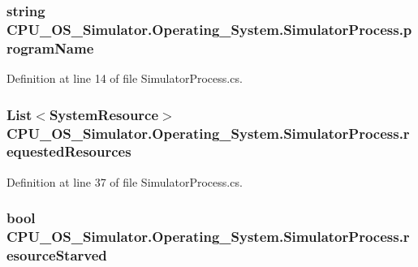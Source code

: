 \subsubsection[{program\+Name}]{\setlength{\rightskip}{0pt plus 5cm}string C\+P\+U\+\_\+\+O\+S\+\_\+\+Simulator.\+Operating\+\_\+\+System.\+Simulator\+Process.\+program\+Name\hspace{0.3cm}{\ttfamily [private]}}\label{class_c_p_u___o_s___simulator_1_1_operating___system_1_1_simulator_process_aacd55b65bf86395ae3c1a446d580030e}


Definition at line 14 of file Simulator\+Process.\+cs.

\hypertarget{class_c_p_u___o_s___simulator_1_1_operating___system_1_1_simulator_process_a93e3c24d4342373d6f0192dce851d269}{}
\subsubsection[{requested\+Resources}]{\setlength{\rightskip}{0pt plus 5cm}List$<${\bf System\+Resource}$>$ C\+P\+U\+\_\+\+O\+S\+\_\+\+Simulator.\+Operating\+\_\+\+System.\+Simulator\+Process.\+requested\+Resources\hspace{0.3cm}{\ttfamily [private]}}\label{class_c_p_u___o_s___simulator_1_1_operating___system_1_1_simulator_process_a93e3c24d4342373d6f0192dce851d269}


Definition at line 37 of file Simulator\+Process.\+cs.

\hypertarget{class_c_p_u___o_s___simulator_1_1_operating___system_1_1_simulator_process_af4d819f0ae416b254b00d1926568b564}{}
\subsubsection[{resource\+Starved}]{\setlength{\rightskip}{0pt plus 5cm}bool C\+P\+U\+\_\+\+O\+S\+\_\+\+Simulator.\+Operating\+\_\+\+System.\+Simulator\+Process.\+resource\+Starved\hspace{0.3cm}{\ttfamily [private]}}\label{class_c_p_u___o_s___simulator_1_1_operating___system_1_1_simulator_process_af4d819f0ae416b254b00d1926568b564}


